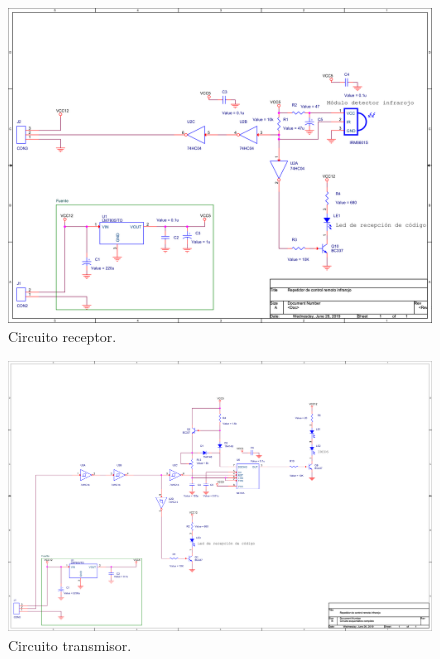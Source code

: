 \begin{figure}[H]
	\centering
	\includegraphics[width=0.9\paperwidth, angle=90]{img/SCH/receiver.png}
	\caption{\footnotesize{Circuito receptor.}}
	\label{fig:IR_receiver_sch}
\end{figure}



\clearpage

\begin{figure}[H]
	\centering
	\includegraphics[width=0.9\paperwidth, angle=90]{img/SCH/transmitter.png}
	\caption{\footnotesize{Circuito transmisor.}}
	\label{fig:IR_transmitter_sch}
\end{figure}


\clearpage